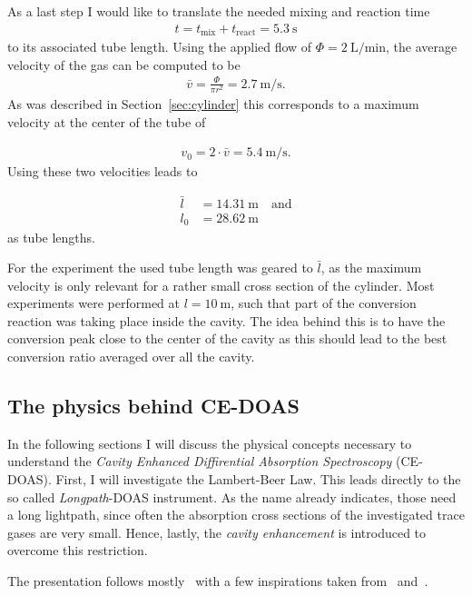As a last step I would like to translate the needed mixing and reaction
time
\begin{align*}
  t = t_{\text{mix}} + t_{\text{react}} = \SI{5.3}{\second}
\end{align*}
to its associated tube length. Using the applied flow of
$\Phi = \SI{2}{\liter\per\minute}$, the average velocity of the gas
can be computed to be
\begin{align*}
  \bar v = \frac{\Phi}{\pi r^2} = \SI{2.7}{\meter\per\second}. 
\end{align*}
As was described in Section~\ref{sec:cylinder} this corresponds to a
maximum velocity at the center of the tube of

\begin{align*}
  v_0 = 2\cdot \bar v = \SI{5.4}{\meter\per\second}.
\end{align*}
Using these two velocities leads to

\begin{align*}
  \bar l & = \SI{14.31}{\meter} \quad \text{and}\\
  l_0 & = \SI{28.62}{\meter}
\end{align*}
as tube lengths.

For the experiment the used tube length was geared to $\bar l$, as the
maximum velocity is only relevant for a rather small cross section of
the cylinder. Most experiments were performed at
$l = \SI{10}{\meter}$, such that part of the conversion reaction was
taking place inside the cavity. The idea behind this is to have the
conversion peak close to the center of the cavity as this should lead
to the best conversion ratio averaged over all the cavity.

\subsection{The physics behind CE-DOAS}
\label{sec:ce-doas-physics}

In the following sections I will discuss the physical concepts
necessary to understand the \emph{Cavity Enhanced Diffirential
  Absorption Spectroscopy} (CE-DOAS). First, I will investigate the
Lambert-Beer Law. This leads directly to the so called
\emph{Longpath}-DOAS instrument. As the name already indicates, those
need a long lightpath, since often the absorption cross sections of
the investigated trace gases are very small. Hence, lastly, the
\emph{cavity enhancement} is introduced to overcome this restriction.

The presentation follows mostly~\cite{fp58} with a few inspirations
taken from~\cite{bsc} and~\cite{platt}.


